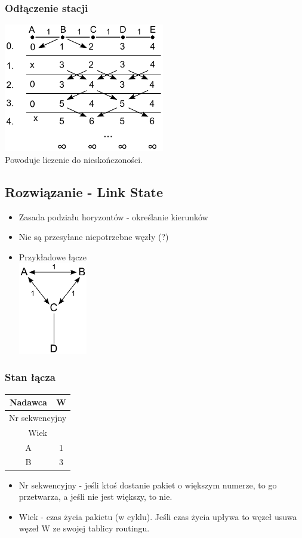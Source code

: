 			\subsubsection{Odłączenie stacji}
				\includegraphics[width=7.0cm]{./images/image43.pdf}\\
				Powoduje liczenie do nieskończoności.
		\subsection{Rozwiązanie - Link State}
			\begin{itemize}
				\item Zasada podziału horyzontów - określanie kierunków
				\item Nie są przesyłane niepotrzebne węzły (?)
				\item Przykładowe łącze\\
				\includegraphics[width=3.0cm]{./images/image44.pdf}
			\end{itemize}
			\subsubsection{Stan łącza}
				\begin{tabular}{|c|l|c|c|}
					\hline
					\multicolumn{3}{|c|}{Nadawca}           & W      \\ \hline
					\multicolumn{4}{|c|}{Nr sekwencyjny}             \\ \hline
					\multicolumn{4}{|c|}{Wiek}                       \\ \hline
					\multicolumn{3}{|c|}{A} & \multicolumn{1}{c|}{1} \\ \hline
					\multicolumn{3}{|c|}{B} & \multicolumn{1}{c|}{3} \\ \hline
				\end{tabular}
				\begin{itemize}
					\item Nr sekwencyjny - jeśli ktoś dostanie pakiet o większym numerze, to go przetwarza, a jeśli nie jest większy, to nie.
					\item Wiek - czas życia pakietu (w cyklu). Jeśli czas życia upływa to węzeł usuwa węzeł W ze swojej tablicy routingu.
				\end{itemize}
